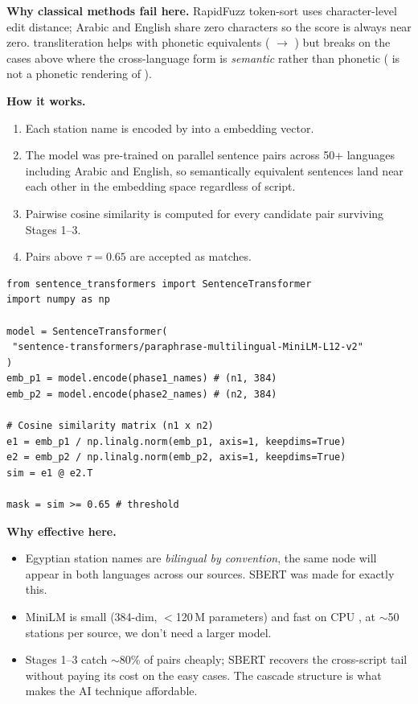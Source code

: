 \textbf{Why classical methods fail here.} RapidFuzz token-sort uses
character-level edit distance; Arabic and English share zero
characters so the score is always near zero. 
transliteration helps with phonetic equivalents ( $\to$
) but breaks on the cases above where the cross-language
form is \emph{semantic} rather than phonetic
( is not a phonetic rendering of
).

\textbf{How it works.}
\begin{enumerate}
 \item Each station name is encoded by
 into a  embedding vector.
 \item The model was pre-trained on parallel sentence pairs across 50+
 languages including Arabic and English, so semantically
 equivalent sentences land near each other in the embedding
 space regardless of script.
 \item Pairwise cosine similarity is computed for every candidate
 pair surviving Stages 1--3.
 \item Pairs above $\tau = 0.65$ are accepted as matches.
\end{enumerate}

\begin{lstlisting}[caption={Stage-4 SBERT matching, simplified.}]
from sentence_transformers import SentenceTransformer
import numpy as np

model = SentenceTransformer(
 "sentence-transformers/paraphrase-multilingual-MiniLM-L12-v2"
)
emb_p1 = model.encode(phase1_names) # (n1, 384)
emb_p2 = model.encode(phase2_names) # (n2, 384)

# Cosine similarity matrix (n1 x n2)
e1 = emb_p1 / np.linalg.norm(emb_p1, axis=1, keepdims=True)
e2 = emb_p2 / np.linalg.norm(emb_p2, axis=1, keepdims=True)
sim = e1 @ e2.T

mask = sim >= 0.65 # threshold
\end{lstlisting}

\textbf{Why effective here.}
\begin{itemize}
 \item Egyptian station names are \emph{bilingual by convention}, 
 the same node will appear in both languages across our sources.
 SBERT was made for exactly this.
 \item MiniLM is small (384-dim, $<$120\,M parameters) and fast on CPU
, at $\sim$50 stations per source, we don't need a larger model.
 \item Stages 1--3 catch $\sim$80\% of pairs cheaply; SBERT recovers
 the cross-script tail without paying its cost on the easy
 cases. The cascade structure is what makes the AI technique
 affordable.
\end{itemize}

